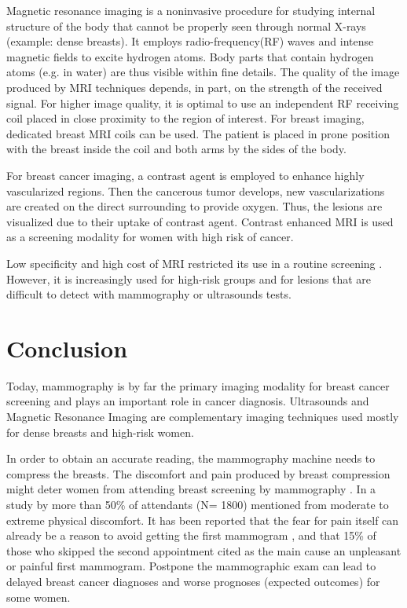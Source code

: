 Magnetic resonance imaging is a noninvasive procedure for studying internal structure of the body that cannot be properly seen through normal X-rays (example: dense breasts).  It employs radio-frequency(RF) waves and intense magnetic fields to excite hydrogen atoms. Body parts that contain hydrogen atoms (e.g. in water) are thus visible within fine details. The quality of the image produced by MRI techniques depends, in part, on the strength of the received signal. For higher image quality, it is optimal to use an independent RF receiving coil placed in close proximity to the region of interest.  For breast imaging, dedicated breast MRI coils can be used. The patient is placed in prone position with the breast inside the coil and both arms by the sides of the body.

For breast cancer imaging, a contrast agent is employed to enhance highly vascularized regions. Then the cancerous tumor develops, new vascularizations are created on the direct surrounding to provide oxygen. Thus, the lesions are visualized due to their uptake of contrast agent. Contrast enhanced MRI is used as a screening modality for women with high risk of cancer.  

Low specificity and high cost of MRI restricted its use in a routine screening \citep{peters_meta_2008}. However, it is increasingly used for high-risk groups and for lesions that are difficult to detect with mammography or ultrasounds tests. 


\section{Conclusion}\label{section:conlusion}
Today, mammography is by far the primary imaging modality for breast cancer screening and plays an important role in cancer diagnosis. Ultrasounds and Magnetic Resonance Imaging are complementary imaging techniques used mostly for dense breasts and high-risk women.
 
In order to obtain an accurate reading, the mammography machine needs to compress the breasts.  The discomfort and pain produced by breast compression might deter women from attending breast screening by mammography \citep{aro_psychosocial_1999,fleming_intermittent_2013}. In a study by \citep{dullum_rates_2000} more than 50\% of attendants (N= 1800) mentioned from moderate to extreme physical discomfort.  It has been reported that the
fear for pain itself can already be a reason to avoid getting the first mammogram \citep{andrews_pain_2001}, and that 15\% of those who skipped the second appointment cited as the main cause an unpleasant or painful first mammogram\citep{fleming_intermittent_2013,whelehan_effect_2013}.  Postpone the mammographic exam can lead to delayed breast cancer diagnoses and worse prognoses (expected outcomes) for some women.

